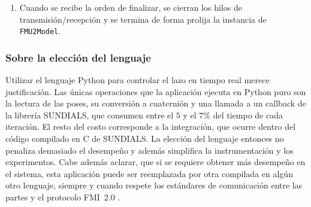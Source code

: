 \begin{enumerate}
\begin{itemize}
			\item Se leen las variables que actúan como salida del modelo utilizando el método \verb|getReal| de \verb|FMU2Model| y se transforma la orientación a cuaterniones.
			\item Se envía la pose por el puerto especificado.
			\item Se vuelve a comenzar desde el punto $6.$
		\end{itemize}
	\item Cuando se recibe la orden de finalizar, se cierran los hilos de transmisión/recepción y se termina de forma prolija la instancia de \verb|FMU2Model|.
\end{enumerate}






\subsubsection{Sobre la elección del lenguaje}
Utilizar el lenguaje Python para controlar el lazo en tiempo real merece justificación. Las únicas operaciones que la aplicación ejecuta en Python puro son la lectura de las poses, su conversión a cuaternión y una llamada a un callback de la librería SUNDIALS, que consumen entre el $5$ y el $7\%$ del tiempo de cada iteración. El resto del costo corresponde a la integración, que ocurre dentro del código compilado en C de SUNDIALS. La elección del lenguaje entonces no penaliza demasiado el desempeño y además simplifica la instrumentación y los experimentos. Cabe además aclarar, que si se requiere obtener más desempeño en el sistema, esta aplicación puede ser reemplazada por otra compilada en algún otro lenguaje, siempre y cuando respete los estándares de comunicación entre las partes y el protocolo FMI~2.0 \cite{blochwitz2012}.


